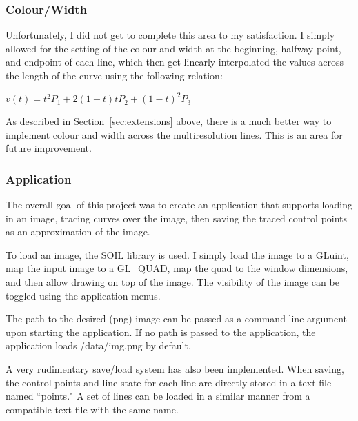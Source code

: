 \documentclass[11pt]{article}
\renewcommand{\sec}[1]{Section~\ref{sec:#1}}
\begin{document}
\subsubsection{Colour/Width}
\label{sec:colourwidth}
Unfortunately, I did not get to complete this area to my satisfaction. I simply allowed for the setting of the colour and width at the beginning, halfway point, and endpoint of each line, which then get linearly interpolated the values across the length of the curve using the following relation:
\begin{center}
$v(t) = t^{2}P_{1} + 2(1-t)tP_{2} + (1-t)^{2}P_{3}$
\end{center}

As described in \sec{extensions} above, there is a much better way to implement colour and width across the multiresolution lines. This is an area for future improvement.

\subsubsection{Application}
\label{sec:application}
The overall goal of this project was to create an application that supports loading in an image, tracing curves over the image, then saving the traced control points as an approximation of the image.

To load an image, the SOIL library is used. I simply load the image to a GLuint, map the input image to a GL\_QUAD, map the quad to the window dimensions, and then allow drawing on top of the image. The visibility of the image can be toggled using the application menus.

The path to the desired (png) image can be passed as a command line argument upon starting the application. If no path is passed to the application, the application loads /data/img.png by default.

A very rudimentary save/load system has also been implemented. When saving, the control points and line state for each line are directly stored in a text file named ``points." A set of lines can be loaded in a similar manner from a compatible text file with the same name.

\newpage

\end{document}
